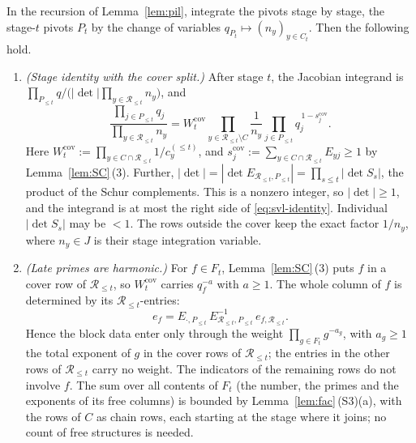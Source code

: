 \begin{theorem}\label{thm:svl}\label{thm:SVL}
In the recursion of Lemma~\ref{lem:pil}, integrate the pivots stage by stage, the stage-$t$ pivots $P_t$ by the
change of variables $q_{P_t}\mapsto(n_y)_{y\in C_t}$. Then the following hold.
\begin{enumerate}[label=(\roman*),leftmargin=*]
\item \emph{(Stage identity with the cover split.)} After stage $t$, the Jacobian integrand is
  $\prod_{P_{\le t}}q\big/\allowbreak\bigl(|\det|\prod_{y\in\mathcal R_{\le t}}n_y\bigr)$, and
  \begin{equation}\label{eq:svl-identity}
    \frac{\prod_{j\in P_{\le t}}q_j}{\prod_{y\in\mathcal R_{\le t}}n_y}
    =W_t^{\mathrm{cov}}\prod_{y\in\mathcal R_{\le t}\setminus C}\frac1{n_y}\prod_{j\in P_{\le t}}q_j^{\,1-s_j^{\mathrm{cov}}}.
  \end{equation}
  Here $W_t^{\mathrm{cov}}:=\prod_{y\in C\cap\mathcal R_{\le t}}1/c_y^{(\le t)}$, and
  $s_j^{\mathrm{cov}}:=\sum_{y\in C\cap\mathcal R_{\le t}}E_{yj}\ge1$ by Lemma~\ref{lem:SC}\,(3). Further,
  $|\det|=|\det E_{\mathcal R_{\le t},P_{\le t}}|=\prod_{s\le t}|\det S_s|$, the product of the Schur complements. This
  is a nonzero integer, so $|\det|\ge1$, and the integrand is at most the right side of \eqref{eq:svl-identity}.
  Individual $|\det S_s|$ may be $<1$. The rows outside the cover keep the exact factor $1/n_y$, where $n_y\in J$ is
  their stage integration variable.
\item \emph{(Late primes are harmonic.)} For $f\in F_t$, Lemma~\ref{lem:SC}\,(3) puts $f$ in a cover row
  of $\mathcal R_{\le t}$, so $W_t^{\mathrm{cov}}$ carries $q_f^{-a}$ with $a\ge1$. The whole column of $f$ is
  determined by its $\mathcal R_{\le t}$-entries:
  \[
    e_f=E_{\cdot,P_{\le t}}\,E_{\mathcal R_{\le t},P_{\le t}}^{-1}\,e_{f,\mathcal R_{\le t}} .
  \]
  Hence the block data enter only through the weight $\prod_{g\in F_t}g^{-a_g}$, with $a_g\ge1$ the total exponent
  of $g$ in the cover rows of $\mathcal R_{\le t}$; the entries in the other rows of $\mathcal R_{\le t}$ carry no weight.
  The indicators of the remaining rows do not involve $f$. The sum over all contents of $F_t$ (the number, the primes
  and the exponents of its free columns) is bounded by Lemma~\ref{lem:fac}\,(S3)(a), with the rows of $C$ as chain rows,
  each starting at the stage where it joins; no count of free structures is needed.

\end{enumerate}
\end{theorem}
